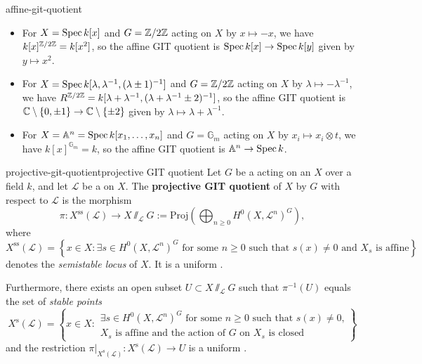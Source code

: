 \begin{example}{affine-git-quotient}
    \begin{itemize}
        \item For $X = \operatorname{Spec} k[x]$ and $G = \mathbb{Z}/2\mathbb{Z}$ acting on $X$ by $x \mapsto -x$, we have $k[x]^{\mathbb{Z}/2\mathbb{Z}} = k[x^2]$, so the affine GIT quotient is $\operatorname{Spec} k[x] \to \operatorname{Spec} k[y]$ given by $y \mapsto x^2$.
        \item For $X = \operatorname{Spec} k[\lambda, \lambda^{-1}, (\lambda \pm 1)^{-1}]$ and $G = \mathbb{Z}/2\mathbb{Z}$ acting on $X$ by $\lambda \mapsto -\lambda^{-1}$, we have $R^{\mathbb{Z}/2\mathbb{Z}} = k[\lambda + \lambda^{-1}, (\lambda + \lambda^{-1} \pm 2)^{-1}]$, so the affine GIT quotient is $\mathbb{C} \setminus \{ 0, \pm 1 \} \to \mathbb{C} \setminus \{ \pm 2 \}$ given by $\lambda \mapsto \lambda + \lambda^{-1}$.
        \item For $X = \mathbb{A}^n = \operatorname{Spec} k[x_1, \ldots, x_n]$ and $G = \mathbb{G}_m$ acting on $X$ by $x_i \mapsto x_i \otimes t$, we have $k[x]^{\mathbb{G}_m} = k$, so the affine GIT quotient is $\mathbb{A}^n \to \operatorname{Spec} k$.
    \end{itemize}
\end{example}

\begin{topic}{projective-git-quotient}{projective GIT quotient}
    Let $G$ be a   acting on an  $X$ over a field $k$, and let $\mathcal{L}$ be a   on $X$. The \textbf{projective GIT quotient} of $X$ by $G$ with respect to $\mathcal{L}$ is the morphism
    \[ \pi : X^\text{ss}(\mathcal{L}) \to X \sslash_\mathcal{L} G := \text{Proj}\left(\bigoplus_{n \ge 0} H^0(X, \mathcal{L}^n)^G \right) , \]
    where
    \[ X^\text{ss}(\mathcal{L}) = \left\{ x \in X : \exists s \in H^0(X, \mathcal{L}^n)^G \text{ for some $n \ge 0$ such that $s(x) \ne 0$ and $X_s$ is affine} \right\} \]
    denotes the \textit{semistable locus} of $X$. It is a uniform .
    
    Furthermore, there exists an open subset $U \subset X \sslash_\mathcal{L} G$ such that $\pi^{-1}(U)$ equals the set of \textit{stable points} \[ X^\text{s}(\mathcal{L}) = \left\{ x \in X : \begin{array}{c} \exists s \in H^0(X, \mathcal{L}^n)^G \text{ for some $n \ge 0$ such that $s(x) \ne 0$,} \\ \text{$X_s$ is affine and the action of $G$ on $X_s$ is closed} \end{array} \right\} \]
    and the restriction $\pi|_{X^\text{s}(\mathcal{L})} : X^\text{s}(\mathcal{L}) \to U$ is a uniform .
\end{topic}

